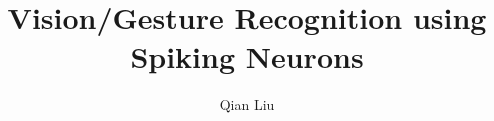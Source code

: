 \documentclass[12pt,PhD,twoside]{muthesis}
\begin{document}

\title{Vision/Gesture Recognition using Spiking Neurons}
\author{Qian Liu}

\beforeabstract
















%

\end{document}
